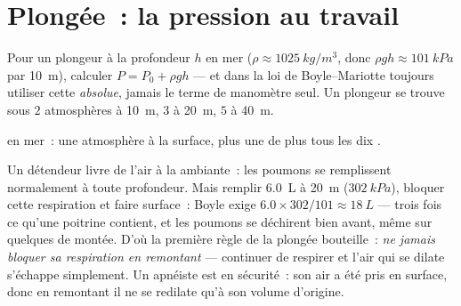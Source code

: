 \section{Plongée~: la pression au travail}

\begin{method}\label{met:g10:pressure:dive}
Pour un plongeur à la profondeur $h$ en mer
($\rho \approx \qty{1025}{kg/m^3}$, donc
$\rho g h \approx \qty{101}{kPa}$ par \qty{10}{m}), calculer
$P = P_0 + \rho g h$ --- et dans la loi de
Boyle--Mariotte toujours utiliser cette 
\emph{absolue}, jamais le terme de
manomètre seul. Un plongeur se trouve sous $2$
atmosphères à \qty{10}{m}, $3$ à \qty{20}{m}, $5$ à \qty{40}{m}.
\end{method}

\begin{omfigure}

{\small {} en mer~: une atmosphère à la surface,
plus une de plus tous les dix .}
\end{omfigure}

\begin{remark}\label{rem:g10:pressure:breath}
Un détendeur livre de l'air à la  ambiante~: les
poumons se remplissent normalement à toute profondeur. Mais remplir
\qty{6.0}{L} à \qty{20}{m} ($\qty{302}{kPa}$), bloquer cette
respiration et faire surface~: Boyle exige
$6.0 \times 302/101 \approx \qty{18}{L}$ --- trois fois ce qu'une
poitrine contient, et les poumons se déchirent bien avant, même sur
quelques  de montée. D'où la première règle de la
plongée bouteille~: \emph{ne jamais bloquer sa respiration en
remontant} --- continuer de respirer et l'air qui se dilate s'échappe
simplement. Un apnéiste est en sécurité~: son air a été pris en surface,
donc en remontant il ne se redilate qu'à son volume d'origine.
\end{remark}

